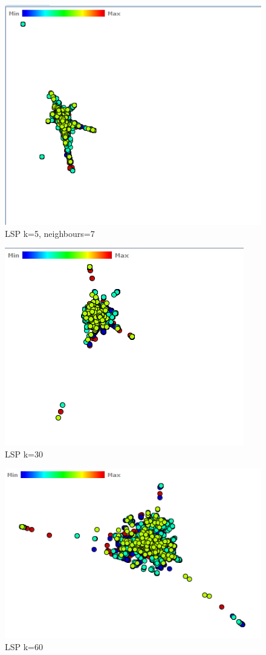 \documentclass[ 10pt ]{fphw}
\begin{document}
\begin{center}
\begin{figure}[H]
    \centering
	\includegraphics[width=0.65\columnwidth]{task2c/reutersLSP-k5-N7.PNG}
	\caption{LSP k=5, neighbours=7}
	\label{fig:reutlsp5.7}
	\end{figure}
\end{center}

\begin{center}
\begin{figure}[H]
    \centering
	\includegraphics[width=0.65\columnwidth]{task2c/reutersLSP-k30.PNG}
	\caption{LSP k=30}
	\label{fig:reutlsp30}
	\end{figure}
\end{center}

\begin{center}
\begin{figure}[H]
    \centering
	\includegraphics[width=0.65\columnwidth]{task2c/reutersLSP-k60.PNG}
	\caption{LSP k=60}
	\label{fig:reutlsp60}
	\end{figure}
\end{center}
\end{document}
